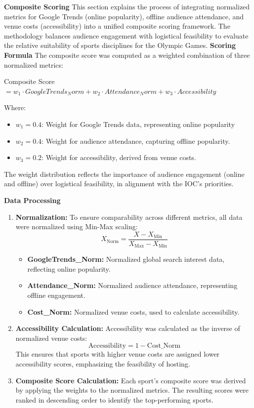 \documentclass[12pt]{article}
\begin{document}
\textbf{Composite Scoring}
This section explains the process of integrating normalized metrics for Google Trends (online popularity), offline audience attendance, and venue costs (accessibility) into a unified composite scoring framework. The methodology balances audience engagement with logistical feasibility to evaluate the relative suitability of sports disciplines for the Olympic Games.
\textbf{Scoring Formula}
The composite score was computed as a weighted combination of three normalized metrics:

Composite Score \(=w_{1} \cdot GoogleTrends_Norm + w_{2} \cdot Attendance_Norm + w_{3} \cdot Accessibility\)


Where:
\begin{itemize}
    \item \(w_{1}=0.4\): Weight for Google Trends data, representing online popularity
    \item \(w_{2}=0.4\): Weight for audience attendance, capturing offline popularity.
    \item \(w_{3}=0.2\): Weight for accessibility, derived from venue costs.
\end{itemize}
The weight distribution reflects the importance of audience engagement (online and offline) over logistical feasibility, in alignment with the IOC’s priorities.

\textbf{Data Processing}
\begin{enumerate}
    \item \textbf{Normalization:}
    To ensure comparability across different metrics, all data were normalized using Min-Max scaling:
    \[
    X_{\text{Norm}} = \frac{X - X_{\text{Min}}}{X_{\text{Max}} - X_{\text{Min}}}
    \]
    \begin{itemize}
        \item \textbf{GoogleTrends\_Norm:} Normalized global search interest data, reflecting online popularity.
        \item \textbf{Attendance\_Norm:} Normalized audience attendance, representing offline engagement.
        \item \textbf{Cost\_Norm:} Normalized venue costs, used to calculate accessibility.
    \end{itemize}

    \item \textbf{Accessibility Calculation:}
    Accessibility was calculated as the inverse of normalized venue costs:
    \[
    \text{Accessibility} = 1 - \text{Cost\_Norm}
    \]
    This ensures that sports with higher venue costs are assigned lower accessibility scores, emphasizing the feasibility of hosting.

    \item \textbf{Composite Score Calculation:}
    Each sport’s composite score was derived by applying the weights to the normalized metrics. The resulting scores were ranked in descending order to identify the top-performing sports.
\end{enumerate}
\end{document}
